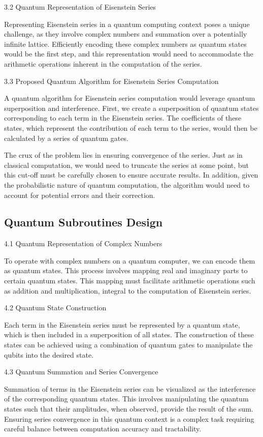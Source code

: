 \documentclass[11pt]{article}
\begin{document}
3.2 Quantum Representation of Eisenstein Series


Representing Eisenstein series in a quantum computing context poses a unique challenge, as they involve complex numbers and summation over a potentially infinite lattice. Efficiently encoding these complex numbers as quantum states would be the first step, and this representation would need to accommodate the arithmetic operations inherent in the computation of the series.


3.3 Proposed Quantum Algorithm for Eisenstein Series Computation


A quantum algorithm for Eisenstein series computation would leverage quantum superposition and interference. First, we create a superposition of quantum states corresponding to each term in the Eisenstein series. The coefficients of these states, which represent the contribution of each term to the series, would then be calculated by a series of quantum gates.


The crux of the problem lies in ensuring convergence of the series. Just as in classical computation, we would need to truncate the series at some point, but this cut-off must be carefully chosen to ensure accurate results. In addition, given the probabilistic nature of quantum computation, the algorithm would need to account for potential errors and their correction.


\subsection{Quantum Subroutines Design}

4.1 Quantum Representation of Complex Numbers


To operate with complex numbers on a quantum computer, we can encode them as quantum states. This process involves mapping real and imaginary parts to certain quantum states. This mapping must facilitate arithmetic operations such as addition and multiplication, integral to the computation of Eisenstein series.


4.2 Quantum State Construction


Each term in the Eisenstein series must be represented by a quantum state, which is then included in a superposition of all states. The construction of these states can be achieved using a combination of quantum gates to manipulate the qubits into the desired state.


4.3 Quantum Summation and Series Convergence


Summation of terms in the Eisenstein series can be visualized as the interference of the corresponding quantum states. This involves manipulating the quantum states such that their amplitudes, when observed, provide the result of the sum. Ensuring series convergence in this quantum context is a complex task requiring careful balance between computation accuracy and tractability.
\end{document}
